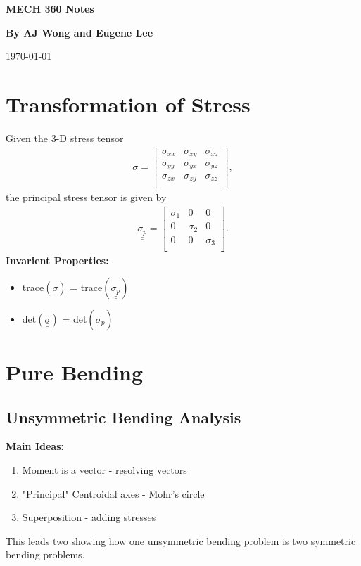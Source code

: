 \documentclass{article}
\numberwithin{equation}{subsection}
\newcommand{\mm}[9]{\begin{bmatrix}
  #1 & #2 & #3\\
  #4 & #5 &#6\\
  #7 & #8 & #9\\
\end{bmatrix}}
\newcommand{\tensor}[1]{\underline{\underline{#1}}}
\begin{document}
\begin{titlepage}
    \title{}
    \author{}
    \date{}
    \begin{center}
        \vspace*{3cm}
            
        \Huge
        \textbf{MECH 360 Notes}
            
        \vspace{1cm}
 
        \vspace{1.5cm}
        \Large
        \textbf{By AJ Wong and Eugene Lee} \\                    %
   
        \vfill
   
        \vspace{1cm}

        \Large
        \today %
    \end{center}
\end{titlepage}

\tableofcontents

\newpage

\section{Transformation of Stress}
Given the 3-D stress tensor
\begin{align}
  \tensor{\sigma} = \mm{\sigma_{xx}}{\sigma_{xy}}{\sigma_{xz}}{\sigma_{yy}}{\sigma_{yx}}{\sigma_{yz}}{\sigma_{zx}}{\sigma_{zy}}{\sigma_{zz}},
\end{align}
the principal stress tensor is given by
\begin{align}
  \tensor{\sigma_p} = \mm{\sigma_1}{0}{0}{0}{\sigma_2}{0}{0}{0}{\sigma_3}.
\end{align}
\textbf{Invarient Properties:}
\begin{itemize}
  \item trace$(\tensor{\sigma})$ = trace$(\tensor{\sigma_p})$
  \item det$(\tensor{\sigma})$ = det$(\tensor{\sigma_p})$
\end{itemize}

\section{Pure Bending}
\subsection{Unsymmetric Bending Analysis}
\textbf{Main Ideas:}
\begin{enumerate}
  \item Moment is a vector - resolving vectors
  \item "Principal" Centroidal axes - Mohr's circle
  \item Superposition - adding stresses
\end{enumerate}
This leads two showing how one unsymmetric bending problem is two symmetric bending problems.
\\
\end{document}
